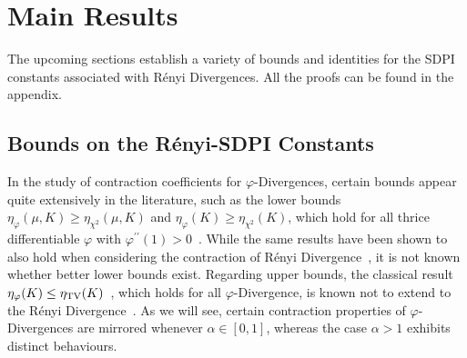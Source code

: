 \documentclass[conference,letterpaper]{IEEEtran}
\begin{document}
\section{Main Results}\label{section:main_results}\noindent
The upcoming sections establish a variety of bounds and identities for the SDPI constants associated with R\'enyi Divergences. All the proofs can be found in the appendix.

\subsection{Bounds on the R\'enyi-SDPI Constants}\noindent
In the study of contraction coefficients for $\varphi$-Divergences, certain bounds appear quite extensively in the literature, such as the lower bounds $\eta_{\varphi}(\mu, K)\geq\eta_{\chi^2}(\mu, K)$ and $\eta_{\varphi}(K)\geq\eta_{\chi^2}(K)$, which hold for all thrice differentiable $\varphi$ with $\varphi^{\prime\prime}(1)>0$~\cite[Theorem III.3]{raginsky2016strong}. While the same results have been shown to also hold when considering the contraction of R\'enyi Divergence~\cite{jin2024properties}, it is not known whether better lower bounds exist. Regarding upper bounds, the classical result $\eta_\varphi(K) \leq\eta_{\rm TV}(K)$~\cite[Theorem III.1]{raginsky2016strong}, which holds for all $\varphi$-Divergence, is known not to extend to the R\'enyi Divergence~\cite[Example 1]{esposito2024lower}. As we will see, certain contraction properties of $\varphi$-Divergences are mirrored whenever $\alpha\in[0,1]$, whereas the case $\alpha>1$ exhibits distinct behaviours.
\end{document}

